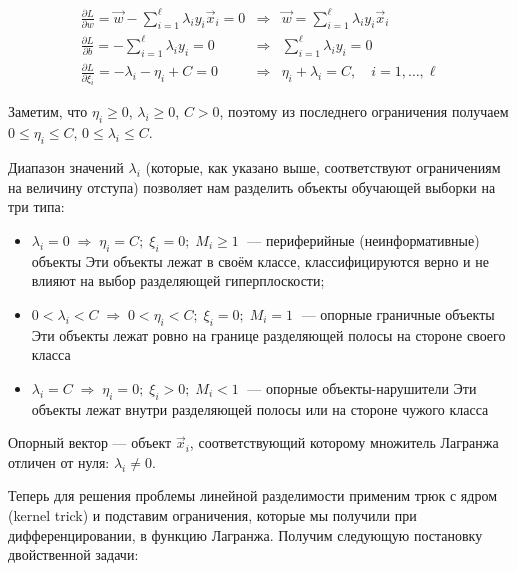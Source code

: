 $$\begin{array}{lcl}
\frac{\partial L}{\partial w} = \vec{w} - \sum\limits_{i=1}^\ell \lambda_i y_i \vec{x}_i = 0 & \Rightarrow & \vec{w} = \sum\limits_{i=1}^\ell \lambda_i y_i \vec{x}_i \\
\frac{\partial L}{\partial b} = -\sum\limits_{i=1}^\ell \lambda_i y_i = 0 & \Rightarrow & \sum\limits_{i=1}^\ell \lambda_i y_i = 0 \\
\frac{\partial L}{\partial \xi_i} = -\lambda_i - \eta_i + C = 0 & \Rightarrow & \eta_i + \lambda_i = C, \quad i = 1, \ldots, \ell
\end{array}$$

\bigskip
Заметим, что $\eta_i \geq 0$, $\lambda_i \geq 0$, $C > 0$, поэтому из последнего ограничения получаем $0 \leq \eta_i \leq C$, $0 \leq \lambda_i \leq C$.

\bigskip
Диапазон значений $\lambda_i$ (которые, как указано выше, соответствуют ограничениям на величину отступа) позволяет нам разделить объекты обучающей выборки на три типа:

\bigskip
\begin{itemize}
 \item $\lambda_i = 0 \; \Rightarrow \; \eta_i = C; \; \xi_i = 0; \; M_i \geq 1 \;$ — периферийные (неинформативные) объекты Эти объекты лежат в своём классе, классифицируются верно и не влияют на выбор разделяющей гиперплоскости;

 \item $0 < \lambda_i < C \; \Rightarrow \; 0 < \eta_i < C; \; \xi_i = 0; \; M_i = 1 \;$ — опорные граничные объекты Эти объекты лежат ровно на границе разделяющей полосы на стороне своего класса

 \item $\lambda_i = C \; \Rightarrow \; \eta_i = 0; \; \xi_i > 0; \; M_i < 1 \;$ — опорные объекты-нарушители Эти объекты лежат внутри разделяющей полосы или на стороне чужого класса
\end{itemize}

\begin{definition}
 Опорный вектор — объект $\vec{x}_i$, соответствующий которому множитель Лагранжа отличен от нуля: $\lambda_i \neq 0$.
\end{definition}

\bigskip
Теперь для решения проблемы линейной разделимости применим трюк с ядром (kernel trick) и подставим ограничения, которые мы получили при дифференцировании, в функцию Лагранжа. Получим следующую постановку двойственной задачи:

